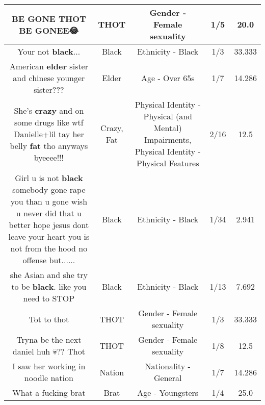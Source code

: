 \documentclass[11pt]{article}
\newlength\mylength
\begin{document}
\begin{center}
\begin{longtable}{|C{.65\mylength}|C{.30\mylength}|C{.12\mylength}|C{.12\mylength}|C{.12\mylength}|}
  \small BE GONE \textbf{THOT} BE GONEE😂\normalsize   & THOT & Gender - Female sexuality & 1/5 & 20.0 \\  \hline
  \small Your not \textbf{black}...\normalsize   & Black & Ethnicity - Black & 1/3 & 33.333 \\  \hline
  \small American \textbf{elder} sister and chinese younger sister???\normalsize   & Elder & Age - Over 65s & 1/7 & 14.286 \\  \hline
  \small She's \textbf{crazy} and on some drugs like wtf Danielle+lil tay her belly \textbf{fat} tho anyways byeeee!!!\normalsize   & Crazy, Fat & Physical Identity - Physical (and Mental) Impairments, Physical Identity - Physical Features & 2/16 & 12.5 \\  \hline
  \small Girl u is not \textbf{black} somebody gone rape you than u gone wish u never did that u better hope jesus dont leave your heart you is not from the hood no offense but......\normalsize   & Black & Ethnicity - Black & 1/34 & 2.941 \\  \hline
  \small she Asian and she try to be \textbf{black}. like  you need to STOP\normalsize   & Black & Ethnicity - Black & 1/13 & 7.692 \\  \hline
  \small Tot to thot\normalsize   & THOT & Gender - Female sexuality & 1/3 & 33.333 \\  \hline
  \small Tryna be the next daniel huh 💀?? Thot\normalsize   & THOT & Gender - Female sexuality & 1/8 & 12.5 \\  \hline
  \small I saw her working in noodle nation\normalsize   & Nation & Nationality - General & 1/7 & 14.286 \\  \hline
  \small What a fucking brat\normalsize   & Brat & Age - Youngsters & 1/4 & 25.0 \\  \hline

\end{longtable}
\end{center}
\end{document}
